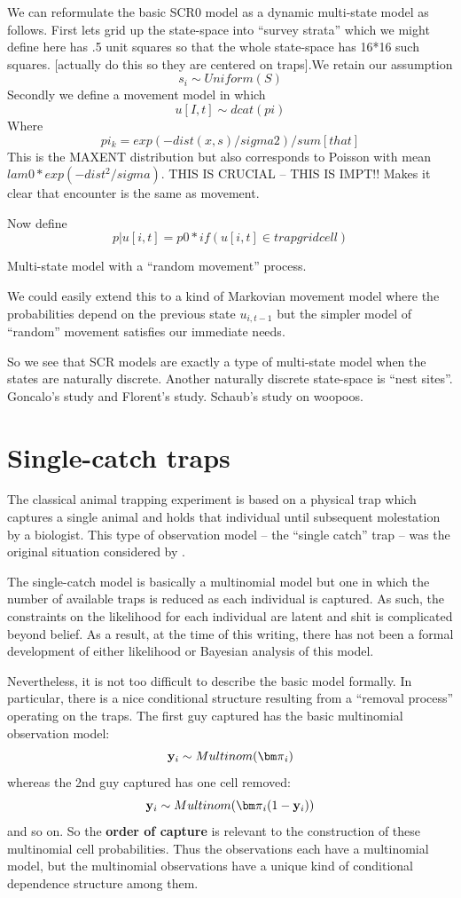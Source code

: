 {We can reformulate the basic SCR0 model as a dynamic multi-state model
as follows.  First lets grid up the state-space into “survey strata”
which we might define here has .5 unit squares so that the whole
state-space has 16*16 such squares. [actually do this so they are
centered on traps].We retain our assumption
\[
 s_{i} \sim Uniform(S)
\]
Secondly we define a movement model in which
\[
u[I,t] \sim dcat(pi)
\]
Where
\[
 pi_{k} = exp(-dist(x,s)/sigma2)/sum[that]
\]
This is the MAXENT distribution but also corresponds to Poisson with
mean $lam0*exp(-dist^2/sigma)$.  THIS IS CRUCIAL – THIS IS IMPT!!
 Makes it clear that encounter is the same as movement.

Now define
\[
 p|u[i,t] = p0*if(u[i,t] \in trap grid cell)
\]

Multi-state model with a “random movement” process.


We could easily extend this to a kind of Markovian movement model
where the probabilities depend on the previous state $u_{i,t-1}$ but
the simpler model of ``random'' movement satisfies our immediate needs.
 
So we see that SCR models are exactly a type of multi-state model when
the states are naturally discrete.  Another naturally discrete
state-space is ``nest sites''. Goncalo’s study and Florent’s
study. Schaub’s study on woopoos.


\section{Single-catch traps}
\label{poisson-mn.sec.singlecatch}

The classical animal trapping experiment is based on a physical trap
which captures a single animal and holds that individual until
subsequent molestation by a biologist. 
This type of observation model -- the ``single catch'' trap -- 
was the original situation considered by \citet{efford:2004}.

The single-catch model is basically a multinomial model but one in
which the number of available traps is reduced as each individual is
captured. As such, the constraints on the likelihood for each
individual are latent and shit is complicated beyond belief.
As a result, at the time of this writing, there has not been a formal
development of either likelihood  or Bayesian analysis of this model.

Nevertheless, it is not too difficult to describe the basic model
formally. In particular, there is a nice conditional structure resulting from a ``removal
process'' operating on the traps.  The first guy captured has the 
basic multinomial observation model:
\[
{\bf y}_{i} \sim Multinom({\bm \pi}_{i})
\]
whereas the 2nd guy captured has one cell removed:
\[
{\bf y}_{i} \sim Multinom({\bm \pi}_{i}(1-{\bf y}_{i})    )
\]
and so on.
So the {\bf order of capture} is relevant to the construction of these
multinomial cell probabilities. 
Thus the observations each have a multinomial model, but the
multinomial observations have a unique kind of conditional dependence
structure among them.

}
